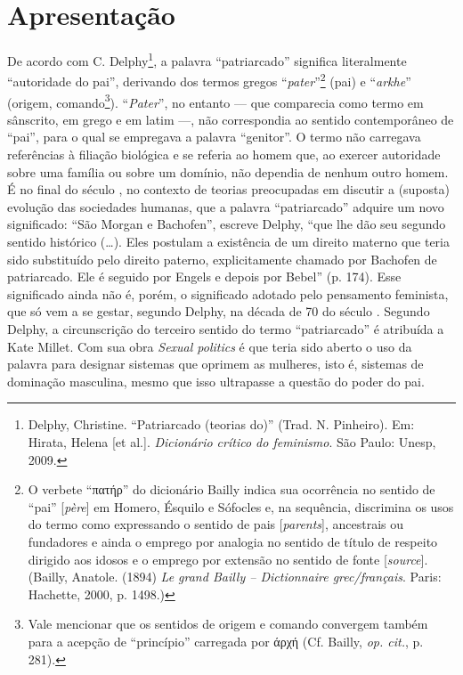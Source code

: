 \chapter{Apresentação}

De acordo com C. Delphy\footnote{Delphy, Christine. ``Patriarcado
  (teorias do)'' (Trad. N. Pinheiro). Em: Hirata, Helena {[}et al.{]}.
  \emph{Dicionário crítico do feminismo}. São Paulo: Unesp, 2009.}, a
palavra ``patriarcado'' significa literalmente ``autoridade do pai'',
derivando dos termos gregos ``\emph{pater}''\footnote{O verbete
  ``πατήρ'' do dicionário Bailly indica sua ocorrência no sentido de
  ``pai'' {[}\emph{père}{]} em Homero, Ésquilo e Sófocles e, na
  sequência, discrimina os usos do termo como expressando o sentido de
  pais {[}\emph{parents}{]}, ancestrais ou fundadores e ainda o emprego
  por analogia no sentido de título de respeito dirigido aos idosos e o
  emprego por extensão no sentido de fonte {[}\emph{source}{]}. (Bailly,
  Anatole. (1894) \emph{Le grand Bailly -- Dictionnaire grec/français}.
  Paris: Hachette, 2000, p. 1498.)} (pai) e ``\emph{arkhe}'' (origem,
comando\footnote{Vale mencionar que os sentidos de origem e comando
  convergem também para a acepção de ``princípio'' carregada por άρχή
  (Cf. Bailly, \emph{op. cit.}, p. 281).}). ``\emph{Pater}'', no entanto
--- que comparecia como termo em sânscrito, em grego e em latim ---, não
correspondia ao sentido contemporâneo de ``pai'', para o qual se
empregava a palavra ``genitor''. O termo não carregava referências à
filiação biológica e se referia ao homem que, ao exercer autoridade
sobre uma família ou sobre um domínio, não dependia de nenhum outro
homem. É no final do século , no contexto de teorias preocupadas em
discutir a (suposta) evolução das sociedades humanas, que a palavra
``patriarcado'' adquire um novo significado: ``São Morgan e Bachofen'',
escreve Delphy, ``que lhe dão seu segundo sentido histórico (\ldots{}). Eles
postulam a existência de um direito materno que teria sido substituído
pelo direito paterno, explicitamente chamado por Bachofen de
patriarcado. Ele é seguido por Engels e depois por Bebel'' (p. 174).
Esse significado ainda não é, porém, o significado adotado pelo
pensamento feminista, que só vem a se gestar, segundo Delphy, na década
de 70 do século . Segundo Delphy, a circunscrição do terceiro sentido
do termo ``patriarcado'' é atribuída a Kate Millet. Com sua obra
\emph{Sexual politics} é que teria sido aberto o uso da palavra para
designar sistemas que oprimem as mulheres, isto é, sistemas de dominação
masculina, mesmo que isso ultrapasse a questão do poder do pai.

